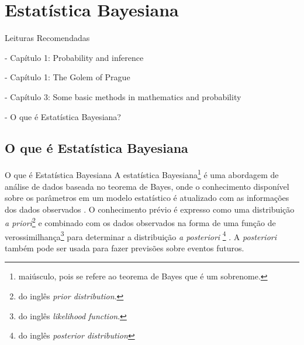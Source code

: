 \section{Estatística Bayesiana}

\begin{frame}{Leituras Recomendadas}
    \begin{vfilleditems}
        \item \citet*{gelman2013bayesian} - Capítulo 1: Probability and inference
        \item \citet*{mcelreath2020statistical} - Capítulo 1: The Golem of Prague
        \item \citet*{gelman2020regression} - Capítulo 3: Some basic methods in mathematics and probability
        \item \citet*{storopoli2021estatisticabayesianaR} - O que é Estatística Bayesiana?
    \end{vfilleditems}
\end{frame}

\subsection{O que é Estatística Bayesiana}
\begin{frame}{O que é Estatística Bayesiana}
    A estatística Bayesiana\footnote{maiúsculo, pois se refere ao teorema de Bayes que é um sobrenome.} é uma abordagem de análise de dados baseada no teorema de Bayes, onde o conhecimento disponível sobre os parâmetros em um modelo estatístico é atualizado com as informações dos dados observados \citep{gelman2013bayesian}. O conhecimento prévio é expresso como uma distribuição \textit{a priori}\footnote{do inglês \foreignlanguage{english}{\textit{prior distribution}}.} e combinado com os dados observados na forma de uma função de verossimilhança\footnote{do inglês \foreignlanguage{english}{\textit{likelihood function}}.} para determinar a distribuição \textit{a posteriori} \footnote{\foreignlanguage{english}{do inglês \textit{posterior distribution}}} . A \textit{posteriori} também pode ser usada para fazer previsões sobre eventos futuros.
\end{frame}

